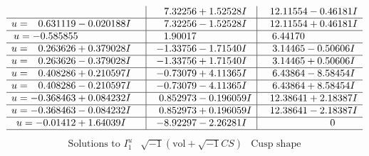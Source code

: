 \documentclass[1p]{elsarticle_modified}
\theoremstyle{definition}
\newcommand{\I}{\sqrt{-1}}
\begin{document}
$$\begin{array}{c|c|c}
 & \phantom{-}7.32256 + 1.52528 I & \phantom{-}12.11554 - 0.46181 I \\ \hline\begin{aligned}
u &= \phantom{-}0.631119 - 0.020188 I\end{aligned}
 & \phantom{-}7.32256 - 1.52528 I & \phantom{-}12.11554 + 0.46181 I \\ \hline\begin{aligned}
u &= -0.585855\phantom{ +0.000000I}\end{aligned}
 & \phantom{-}1.90017\phantom{ +0.000000I} & \phantom{-}6.44170\phantom{ +0.000000I} \\ \hline\begin{aligned}
u &= \phantom{-}0.263626 + 0.379028 I\end{aligned}
 & -1.33756 - 1.71540 I & \phantom{-}3.14465 - 0.50606 I \\ \hline\begin{aligned}
u &= \phantom{-}0.263626 - 0.379028 I\end{aligned}
 & -1.33756 + 1.71540 I & \phantom{-}3.14465 + 0.50606 I \\ \hline\begin{aligned}
u &= \phantom{-}0.408286 + 0.210597 I\end{aligned}
 & -0.73079 + 4.11365 I & \phantom{-}6.43864 - 8.58454 I \\ \hline\begin{aligned}
u &= \phantom{-}0.408286 - 0.210597 I\end{aligned}
 & -0.73079 - 4.11365 I & \phantom{-}6.43864 + 8.58454 I \\ \hline\begin{aligned}
u &= -0.368463 + 0.084232 I\end{aligned}
 & \phantom{-}0.852973 - 0.196059 I & \phantom{-}12.38641 + 2.18387 I \\ \hline\begin{aligned}
u &= -0.368463 - 0.084232 I\end{aligned}
 & \phantom{-}0.852973 + 0.196059 I & \phantom{-}12.38641 - 2.18387 I \\ \hline\begin{aligned}
u &= -0.01412 + 1.64039 I\end{aligned}
 & -8.92297 - 2.26281 I & \phantom{-0.000000 } 0\\
 \hline 
 \end{array}$$\newpage$$\begin{array}{c|c|c}  
\text{Solutions to }I^u_{1}& \I (\text{vol} + \sqrt{-1}CS) & \text{Cusp shape}\\

\end{array}$$
\end{document}
